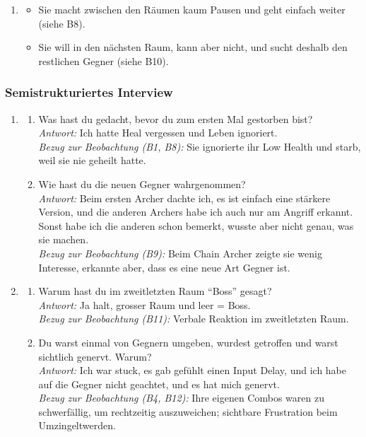 \documentclass[../Main.tex]{subfiles}
\begin{document}
\begin{enumerate}[label=\textbf{B\arabic*}, leftmargin=1.5cm, itemsep=0.8em, resume]
\item
    \begin{itemize}[nosep]
        \item Sie macht zwischen den Räumen kaum Pausen und geht einfach weiter (siehe B8).
        \item Sie will in den nächsten Raum, kann aber nicht, und sucht deshalb den restlichen Gegner (siehe B10).
    \end{itemize}
\end{enumerate}

\subsubsection{Semistrukturiertes Interview}

\begin{enumerate}[label=\textbf{I\arabic*}, leftmargin=1.5cm, itemsep=1em]
\item
\begin{enumerate}[label=\alph*), itemsep=0.6em]
    \item Was hast du gedacht, bevor du zum ersten Mal gestorben bist? \\
        \textit{Antwort:} Ich hatte Heal vergessen und Leben ignoriert. \\
        \textit{Bezug zur Beobachtung (B1, B8):} Sie ignorierte ihr Low Health und starb, weil sie nie geheilt hatte.
    \item Wie hast du die neuen Gegner wahrgenommen? \\
        \textit{Antwort:} Beim ersten Archer dachte ich, es ist einfach eine stärkere Version, und die anderen Archers habe ich auch nur am Angriff erkannt. Sonst habe ich die anderen schon bemerkt, wusste aber nicht genau, was sie machen. \\
        \textit{Bezug zur Beobachtung (B9):} Beim Chain Archer zeigte sie wenig Interesse, erkannte aber, dass es eine neue Art Gegner ist.
\end{enumerate}

\item
\begin{enumerate}[label=\alph*), itemsep=0.6em]
\item Warum hast du im zweitletzten Raum \enquote{Boss} gesagt? \\
    \textit{Antwort:} Ja halt, grosser Raum und leer = Boss. \\
    \textit{Bezug zur Beobachtung (B11):} Verbale Reaktion im zweitletzten Raum.
\item Du warst einmal von Gegnern umgeben, wurdest getroffen und warst sichtlich genervt. Warum? \\
    \textit{Antwort:} Ich war stuck, es gab gefühlt einen Input Delay, und ich habe auf die Gegner nicht geachtet, und es hat mich genervt. \\
    \textit{Bezug zur Beobachtung (B4, B12):} Ihre eigenen Combos waren zu schwerfällig, um rechtzeitig auszuweichen; sichtbare Frustration beim Umzingeltwerden.
\end{enumerate}


\end{enumerate}
\end{document}
